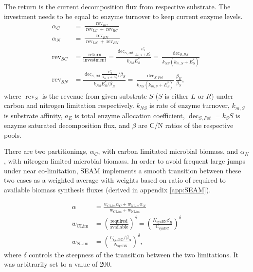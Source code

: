 The return is the current decomposition flux from respective substrate. The
investment needs to be equal to enzyme turnover to keep current enzyme levels.
% 
\begin{subequations}
\label{eq:allocRev}
\begin{align}
\alpha_C &= \frac{\operatorname{rev}_{RC}}{\operatorname{rev}_{LC} + \operatorname{rev}_{RC}} \\
\alpha_N &= \frac{\operatorname{rev}_{RN}}{\operatorname{rev}_{LN} + \operatorname{rev}_{RN}} \\
\operatorname{rev}_{SC} &= \frac{\text{return}}{\text{investment}} 
= \frac{\operatorname{dec}_{S,Pot} \frac{E_S^*}{k_{m,S} + E_S^*}} {k_{NS}E_S^*} 
= \frac{\operatorname{dec}_{S,Pot}} {k_{NS}(k_{m,S} + E_S^*)} \\ 
\operatorname{rev}_{SN} &= \frac{\operatorname{dec}_{S,Pot}
\frac{E_S^*}{k_{m,S} + E_S^*} / \beta_S} {k_{NS} E_S^* / \beta_E} 
= \frac{\operatorname{dec}_{S,Pot}}{k_{NS} (k_{m,S} + E_S^*)}
\frac{\beta_E}{\beta_S}
\text{,} 
\end{align}
\end{subequations}
where $\operatorname{rev}_S$ is the revenue from given substrate $S$ ($S$ is either $L$ or $R$)
under carbon and nitrogen limitation respectively.
$k_{NS}$ is rate of enzyme turnover, $k_{m,S}$ is substrate affinity, $a_E$ is
total enzyme allocation coefficient, $\operatorname{dec}_{S,Pot} = k_S S$ is
enzyme saturated decomposition flux, and $\beta$ are C/N ratios of the
respective pools.

There are two partitionings, $\alpha_C$, with carbon limitated microbial
biomass, and $\alpha_N$, with nitrogen limited microbial biomass. In order to
avoid frequent large jumps under near co-limitation, SEAM implements a smooth
transition between these two cases as a weighted average with weights based
on ratio of required to available biomass synthesis fluxes (derived in
appendix \ref{app:SEAM}).

\begin{subequations}
\label{eq:allocRev}
\begin{align}
\alpha &= \frac{w_{\operatorname{CLim}} \alpha_C + w_{\operatorname{NLim}}
\alpha_N}{w_{\operatorname{CLim}}  + w_{\operatorname{NLim}} } \\
w_\operatorname{CLim} &= \left( \frac{\text{required}}{\text{available}}
\right)^\delta 
= \left( \frac{ N_{\operatorname{synBN}} \beta_B }{ C_{\operatorname{synBC}} }
\right)^\delta
\\
w_\operatorname{NLim} &= \left( \frac{ C_{\operatorname{synBC}} / \beta_B }{
N_{\operatorname{synBN}} } \right)^\delta
\text{,} 
\end{align}
\end{subequations}
where $\delta$ controls the steepness of the transition between the two
limitations. It was arbitrarily set to a value of 200.


